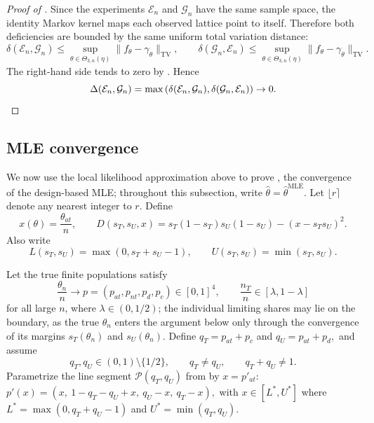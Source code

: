 \documentclass[12pt,reqno]{amsart}
\begin{document}
\begin{proof}[Proof of ]
Since the experiments \(\mathcal E_n\) and \(\mathcal G_n\) have the same sample space, the identity Markov kernel
maps each observed lattice point to itself.  Therefore both deficiencies are
bounded by the same uniform total variation distance:
\[
\delta(\mathcal E_n,\mathcal G_n)
\le
\sup_{\theta\in\Theta_{3,n}(\eta)}
\|f_\theta-\gamma_\theta\|_{\mathrm{TV}},
\qquad
\delta(\mathcal G_n,\mathcal E_n)
\le
\sup_{\theta\in\Theta_{3,n}(\eta)}
\|f_\theta-\gamma_\theta\|_{\mathrm{TV}}.
\]
The right-hand side tends to zero by .  Hence
\[
\Delta(\mathcal E_n,\mathcal G_n)
=
\max\left(\delta(\mathcal E_n,\mathcal G_n),
\delta(\mathcal G_n,\mathcal E_n)\right)
\to0.
\qedhere
\]
\end{proof}

\subsection{MLE convergence}
\label{sec:mleconv}

We now use the local likelihood approximation above to prove , the convergence of
the design-based MLE; throughout this subsection, write \(\hat\theta = \hat{\theta}^{\text{MLE}}\).
Let \(\lfloor r\rceil\) denote any nearest integer to \(r\).  Define
\[
x(\theta)=\frac{\theta_{at}}n,\qquad
D(s_T,s_U,x)
=s_T(1-s_T)s_U(1-s_U)-(x-s_Ts_U)^2.
\]
Also write
\[
L(s_T,s_U)=\max(0,s_T+s_U-1),
\qquad
U(s_T,s_U)=\min(s_T,s_U).
\]

Let the true finite populations satisfy
\[
\frac{\theta_n}{n}\to
p=(p_{at},p_{nt},p_d,p_c)\in[0,1]^4,
\qquad
\frac{n_T}{n}\in[\lambda,1-\lambda]
\]
for all large \(n\), where \(\lambda\in(0,1/2)\); the individual limiting shares may lie on the boundary, as the true \(\theta_n\) enters the argument below only through the convergence of its margins \(s_T(\theta_n)\) and \(s_U(\theta_n)\).  Define
$
q_T=p_{at}+p_c$ and $q_U=p_{at}+p_d,
$
and assume
\[
q_T,q_U\in(0,1)\setminus\{1/2\},\qquad
q_T\ne q_U,\qquad q_T+q_U\ne1. \tag{A}\label{ass:mle-A}
\]
Parametrize the line segment \(\mathcal{P}(q_T,q_U)\) from  by \(x=p'_{at}\):
$
p'(x)=
\left(x,\ 1-q_T-q_U+x,\ q_U-x,\ q_T-x\right),
$
with
$x \in [L^*, U^*]$
where
$
L^*=\max(0,q_T+q_U-1)$ and
$U^*=\min(q_T,q_U).$
\end{document}
